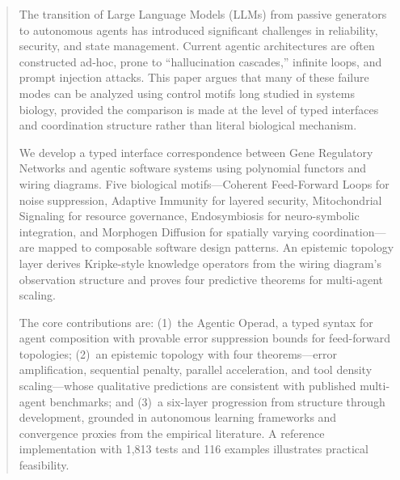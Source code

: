 \begin{abstract}
The transition of Large Language Models (LLMs) from passive generators to autonomous agents
has introduced significant challenges in reliability, security, and state management. Current agentic
architectures are often constructed ad-hoc, prone to ``hallucination cascades,'' infinite loops, and
prompt injection attacks. This paper argues that many of these failure modes can be analyzed using
control motifs long studied in systems biology, provided the comparison is made at the level of typed
interfaces and coordination structure rather than literal biological mechanism.

We develop a typed interface correspondence between Gene Regulatory Networks and agentic software systems using polynomial functors and wiring diagrams. Five biological motifs---Coherent Feed-Forward Loops for noise suppression, Adaptive Immunity for layered security, Mitochondrial Signaling for resource governance, Endosymbiosis for neuro-symbolic integration, and Morphogen Diffusion for spatially varying coordination---are mapped to composable software design patterns. An epistemic topology layer derives Kripke-style knowledge operators from the wiring diagram's observation structure and proves four predictive theorems for multi-agent scaling.

The core contributions are: (1)~the Agentic Operad, a typed syntax for agent composition with provable error suppression bounds for feed-forward topologies; (2)~an epistemic topology with four theorems---error amplification, sequential penalty, parallel acceleration, and tool density scaling---whose qualitative predictions are consistent with published multi-agent benchmarks; and (3)~a six-layer progression from structure through development, grounded in autonomous learning frameworks and convergence proxies from the empirical literature. A reference implementation with 1{,}813 tests and 116 examples illustrates practical feasibility.
\end{abstract}
